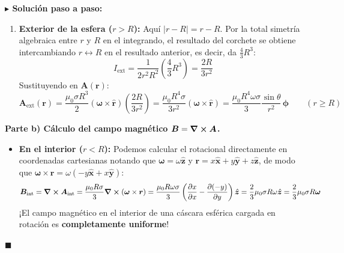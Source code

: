 \documentclass[11pt,a4paper]{book}
\newenvironment{solucion}{%
    \par\medskip\noindent\textbf{\color{blue!65!black}\Large $\blacktriangleright$ Solución paso a paso:}\par\medskip
}{%
    \hfill$\blacksquare$\par\bigskip
}
\newcommand{\rhat}{\hat{\bm{r}}}
\newcommand{\phihat}{\hat{\bm{\phi}}}
\newcommand{\xhat}{\hat{\bm{x}}}
\newcommand{\yhat}{\hat{\bm{y}}}
\newcommand{\zhat}{\hat{\bm{z}}}
\newcommand{\Bvec}{\bm{B}}
\newcommand{\Avec}{\bm{A}}
\begin{document}
\begin{solucion}
\begin{enumerate}
    \item \textbf{Exterior de la esfera ($r > R$):} Aquí $|r - R| = r - R$. Por la total simetría algebraica entre $r$ y $R$ en el integrando, el resultado del corchete se obtiene intercambiando $r \leftrightarrow R$ en el resultado anterior, es decir, da $\frac{4}{3}R^3$:
    \begin{equation}
        I_{\text{ext}} = \frac{1}{2r^2 R^2}\left(\frac{4}{3}R^3\right) = \frac{2R}{3r^2}
    \end{equation}
    Sustituyendo en $\Avec(\bm{r})$:
    \begin{equation}
        \Avec_{\text{ext}}(\bm{r}) = \frac{\mu_0 \sigma R^3}{2} (\bm{\omega} \times \rhat) \left(\frac{2R}{3r^2}\right) = \frac{\mu_0 R^4 \sigma}{3r^2} (\bm{\omega} \times \rhat) = \frac{\mu_0 R^4 \omega \sigma}{3} \frac{\sin\theta}{r^2}\,\phihat \qquad (r \ge R)
    \end{equation}
\end{enumerate}

\medskip
\textbf{Parte b) Cálculo del campo magnético $\Bvec = \curl{\Avec}$.}

\begin{itemize}
    \item \textbf{En el interior ($r < R$):} Podemos calcular el rotacional directamente en coordenadas cartesianas notando que $\bm{\omega} = \omega\zhat$ y $\bm{r} = x\xhat + y\yhat + z\zhat$, de modo que $\bm{\omega} \times \bm{r} = \omega(-y\xhat + x\yhat)$:
    \begin{equation}
        \Bvec_{\text{int}} = \curl{\Avec_{\text{int}}} = \frac{\mu_0 R \sigma}{3} \curl(\bm{\omega} \times \bm{r}) = \frac{\mu_0 R \omega \sigma}{3} \left(\pdv{x}{x} - \pdv{(-y)}{y}\right)\zhat = \frac{2}{3}\mu_0 \sigma R \omega \zhat = \frac{2}{3}\mu_0 \sigma R \bm{\omega}
    \end{equation}
    ¡El campo magnético en el interior de una cáscara esférica cargada en rotación es \textbf{completamente uniforme}!


\end{itemize}
\end{solucion}
\end{document}
